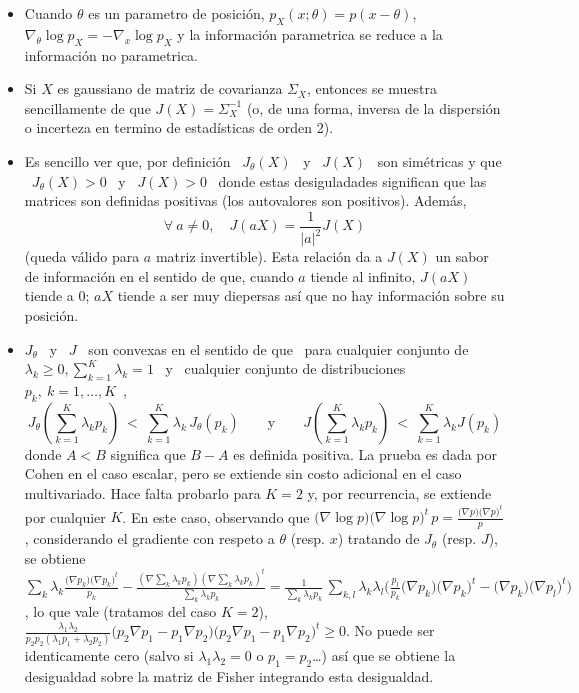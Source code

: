 \begin{itemize}
\item Cuando $\theta$ es un  parametro de posici\'on, $p_X(x;\theta) = p(x -
\theta)$,  $\nabla_\theta \log p_X  = -  \nabla_x \log  p_X$ y  la informaci\'on
parametrica se reduce a la informaci\'on no parametrica.
%
\item  Si $X$  es  gaussiano de  matriz  de covarianza  $\Sigma_X$, entonces  se
  muestra sencillamente de que $J(X)  = \Sigma_X^{-1}$ (o, de una forma, inversa
  de la dispersi\'on o incerteza en termino de estad\'isticas de orden 2).
%
\item Es sencillo ver  que, por definici\'on \ $J_\theta(X)$ \ y  \ $J(X)$ \ son
  sim\'etricas  y  que \  $J_\theta(X)  > 0$  \  y  \ $J(X)  >  0$  \ donde  estas
  desiguladades  significan  que  las  matrices  son  definidas  positivas  (los
  autovalores son positivos).  Adem\'as,
  \[
  \forall \ a \ne 0, \quad J(aX) = \frac{1}{|a|^2} J(X)
  \]
  (queda v\'alido  para $a$  matriz invertible).  Esta  relaci\'on da a  $J(X)$ un
  sabor de  informaci\'on en el sentido  de que, cuando $a$  tiende al infinito,
  $J(aX)$  tiende a  0;  $a X$  tiende  a ser  muy diepersas  as\'i  que no  hay
  informaci\'on sobre su posici\'on.
%
\item $J_\theta$ \ y \ $J$ \ son  convexas en el sentido de que \ para cualquier
  conjunto de  $\lambda_k \ge  0, \sum_{k=1}^K  \lambda_k = 1$  \ y  \ cualquier
  conjunto    de   distribuciones    \   $p_k,    \    k   =    1,   \ldots    ,
  K$~\cite{Coh68, Fri04},
  \[
  J_\theta\left(  \sum_{k=1}^K  \lambda_k  p_k  \right)  \:  <  \:  \sum_{k=1}^K
  \lambda_k  \,  J_\theta\left(  p_k  \right)  \qquad  \mbox{y}  \qquad  J\left(
    \sum_{k=1}^K \lambda_k  p_k \right) \:  < \: \sum_{k=1}^K  \lambda_k J\left(
    p_k \right)
  \]
%
  donde $A < B$ significa que $B-A$ es definida positiva.  La prueba es dada por
  Cohen en  el caso  escalar, pero se  extiende sin  costo adicional en  el caso
  multivariado. Hace falta  probarlo para $K=2$ y, por  recurrencia, se extiende
  por cualquier  $K$. En este  caso, observando que  $\big( \nabla \log  p \big)
  \big( \nabla \log p  \big)^t \, p = \frac{\big( \nabla p  \big) \big( \nabla p
    \big)^t}{p}$, considerando  el gradiente con respeto a  $\theta$ (resp. $x$)
  tratando de  $J_\theta$ (resp. $J$), se obtiene  $\sum_k \lambda_k \frac{\big(
    \nabla p_k \big) \big( \nabla p_k \big)^t}{p_k} - \frac{\left( \nabla \sum_k
      \lambda_k p_k \right) \left( \nabla \sum_k \lambda_k p_k \right)^t}{\sum_k
    \lambda_k  p_k} =  \frac{1}{\sum_k  \lambda_k p_k}  \, \sum_{k,l}  \lambda_k
  \lambda_l  \Big(  \frac{p_l}{p_k} \big(  \nabla  p_k  \big)  \big( \nabla  p_k
  \big)^t - \big( \nabla p_k \big)  \big( \nabla p_l \big)^t \Big)$, lo que vale
  (tratamos del caso  $K = 2$), $ \frac{\lambda_1  \lambda_2}{p_2 p_2 (\lambda_1
    p_1 + \lambda_2 p_2)} \big( p_2 \nabla  p_1 - p_1 \nabla p_2 \big) \big( p_2
  \nabla p_1  - p_1 \nabla p_2 \big)^t  \ge 0$. No puede  ser identicamente cero
  (salvo si $\lambda_1 \lambda_2 = 0$  o $p_1 = p_2$\ldots) as\'i que se obtiene
  la desigualdad sobre la matriz de Fisher integrando esta desigualdad.
\end{itemize}


